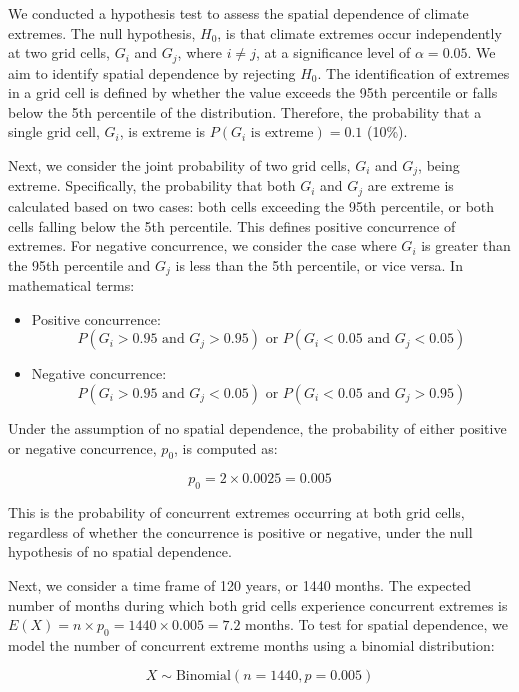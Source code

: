 \documentclass[
]{krantz}
\begin{document}
We conducted a hypothesis test to assess the spatial dependence of climate extremes. The null hypothesis, \(H_0\), is that climate extremes occur independently at two grid cells, \(G_i\) and \(G_j\), where \(i \neq j\), at a significance level of \(\alpha = 0.05\). We aim to identify spatial dependence by rejecting \(H_0\). The identification of extremes in a grid cell is defined by whether the value exceeds the 95th percentile or falls below the 5th percentile of the distribution. Therefore, the probability that a single grid cell, \(G_i\), is extreme is \(P(G_i \text{ is extreme}) = 0.1\) (10\%).

Next, we consider the joint probability of two grid cells, \(G_i\) and \(G_j\), being extreme. Specifically, the probability that both \(G_i\) and \(G_j\) are extreme is calculated based on two cases: both cells exceeding the 95th percentile, or both cells falling below the 5th percentile. This defines positive concurrence of extremes. For negative concurrence, we consider the case where \(G_i\) is greater than the 95th percentile and \(G_j\) is less than the 5th percentile, or vice versa. In mathematical terms:

\begin{itemize}
\item
  Positive concurrence:
  \[
  P(G_i > 0.95 \text{ and } G_j > 0.95) \text{ or } P(G_i < 0.05 \text{ and } G_j < 0.05)
  \]
\item
  Negative concurrence:
  \[
  P(G_i > 0.95 \text{ and } G_j < 0.05) \text{ or } P(G_i < 0.05 \text{ and } G_j > 0.95)
  \]
\end{itemize}

Under the assumption of no spatial dependence, the probability of either positive or negative concurrence, \(p_0\), is computed as:

\[
p_0 = 2 \times 0.0025 = 0.005
\]

This is the probability of concurrent extremes occurring at both grid cells, regardless of whether the concurrence is positive or negative, under the null hypothesis of no spatial dependence.

Next, we consider a time frame of 120 years, or 1440 months. The expected number of months during which both grid cells experience concurrent extremes is \(E(X) = n \times p_0 = 1440 \times 0.005 = 7.2\) months. To test for spatial dependence, we model the number of concurrent extreme months using a binomial distribution:

\[
X \sim \text{Binomial}(n = 1440, p = 0.005)
\]
\vspace{1em}
\end{document}
